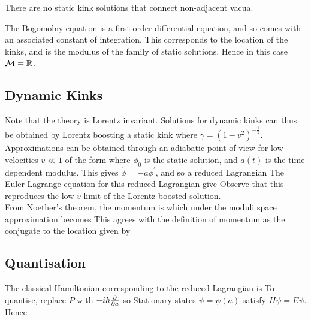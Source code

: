 \documentclass{article}
\begin{document}
\begin{prop}
There are no static kink solutions that connect non-adjacent vacua.
\end{prop}

\begin{prop}
The Bogomolny equation is a first order differential equation, and so comes with an associated constant of integration. This corresponds to the location of the kinks, and is the modulus of the family of static solutions. Hence in this case $\mathcal{M} = \mathbb{R}$. 
\end{prop}
\subsection{Dynamic Kinks}
Note that the theory is Lorentz invariant. Solutions for dynamic kinks can thus be obtained by Lorentz boosting a static kink
where $\gamma = (1-v^2)^{-\frac{1}{2}}$. \\
Approximations can be obtained through an adiabatic point of view for low velocities $v \ll 1$ of the form 
where $\phi_0$ is the static solution, and $a(t)$ is the time dependent modulus. This gives $\dot{\phi} = -\dot{a}\phi^\prime$, and so a reduced Lagrangian 
The Euler-Lagrange equation for this reduced Lagrangian give
Observe that this reproduces the low $v$ limit of the Lorentz boosted solution. \\
From Noether's theorem, the momentum is 
which under the moduli space approximation becomes 
This agrees with the definition of momentum as the conjugate to the location given by 
\subsection{Quantisation}

The classical Hamiltonian corresponding to the reduced Lagrangian is 
To quantise, replace $P$ with $-i\hbar \frac{\partial}{\partial a}$ so 
Stationary states $\psi = \psi(a)$ satisfy $H\psi = E\psi$. Hence 
\end{document}
